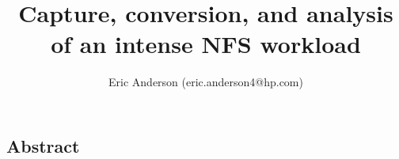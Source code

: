 \documentclass[twocolumn, 10pt]{article}
\begin{document}
\title{\Large \bf Capture, conversion, and analysis of an intense NFS workload}

\author{Eric Anderson (eric.anderson4@hp.com)}
\date{}
\maketitle


\subsection*{Abstract}









\end{document}
